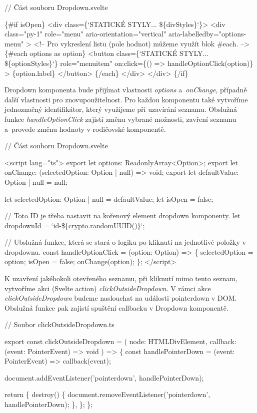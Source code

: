 \begin{prog}
// Část souboru Dropdown.svelte

\{#if isOpen\}
  <div class=\{`STATICKÉ STYLY... \$\{divStyles\}`\}>
    <div 
      class="py-1" role="menu" 
      aria-orientation="vertical" aria-labelledby="options-menu"
    >
      <!-- Pro vykreslení listu (pole hodnot) můžeme využít blok #each. -->
      \{#each options as option\}
        <button
          class=\{`STATICKÉ STYLY... \$\{optionStyles\}`\}
          role="menuitem"
          on:click=\{() => handleOptionClick(option)\}
        >
          \{option.label\}
        </button>
      \{/each\}
    </div>
  </div>
\{/if\}
\end{prog}

Dropdown komponenta bude přijímat vlastnosti \emph{options} a~\emph{onChange}, případně další vlastnosti pro znovupoužitelnost. Pro každou komponentu také vytvoříme jednoznačný identifikátor, který využijeme při uzavírání seznamu.
Obslužná funkce \emph{handleOptionClick} zajistí změnu vybrané možnosti, zavření seznamu a~provede změnu hodnoty v rodičovské komponentě. 

\begin{prog}
// Část souboru Dropdown.svelte
  
<script lang="ts">
  export let options: ReadonlyArray<Option>;
  export let onChange: (selectedOption: Option | null) => void;
  export let defaultValue: Option | null = null;

  let selectedOption: Option | null = defaultValue;
  let isOpen = false;

  // Toto ID je třeba nastavit na kořenový element dropdown komponenty.
  let dropdownId = `id-\$\{crypto.randomUUID()\}`;

  // Ubslužná funkce, která se stará o logiku 
    po kliknutí na jednotlivé položky v dropdownu.
  const handleOptionClick = (option: Option) => \{
    selectedOption = option;
    isOpen = false;
    onChange(option);
  \};
</script>
\end{prog}

K uzavření jakéhokoli otevřeného seznamu, při kliknutí mimo tento seznam, vytvoříme akci (Svelte action) \emph{clickOutsideDropdown}. 
V rámci akce \emph{clickOutsideDropdown} budeme naslouchat na události pointerdown v DOM. Obslužná funkce pak zajistí spuštění callbacku v Dropdown komponentě.

\begin{prog}
// Soubor clickOutsideDropdown.ts

export const clickOutsideDropdown = (
  node: HTMLDivElement,
  callback: (event: PointerEvent) => void
) => \{
  const handlePointerDown = (event: PointerEvent) => callback(event);

  document.addEventListener('pointerdown', handlePointerDown);

  return \{
    destroy() \{
      document.removeEventListener('pointerdown', handlePointerDown);
    \},
  \};
\};
\end{prog}

